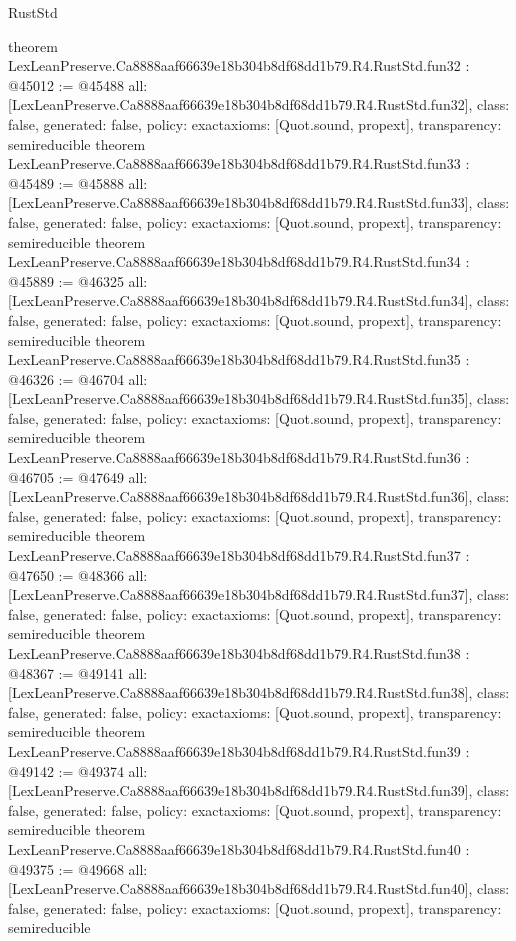 \begin{lexlean}{RustStd}
\begin{coremodule}
{}
theorem LexLeanPreserve.Ca8888aaf66639e18b304b8df68dd1b79.R4.RustStd.fun32 : @45012 := @45488 {
  all: [LexLeanPreserve.Ca8888aaf66639e18b304b8df68dd1b79.R4.RustStd.fun32],
  class: false,
  generated: false,
  policy: exact{axioms: [Quot.sound, propext]},
  transparency: semireducible
}
theorem LexLeanPreserve.Ca8888aaf66639e18b304b8df68dd1b79.R4.RustStd.fun33 : @45489 := @45888 {
  all: [LexLeanPreserve.Ca8888aaf66639e18b304b8df68dd1b79.R4.RustStd.fun33],
  class: false,
  generated: false,
  policy: exact{axioms: [Quot.sound, propext]},
  transparency: semireducible
}
theorem LexLeanPreserve.Ca8888aaf66639e18b304b8df68dd1b79.R4.RustStd.fun34 : @45889 := @46325 {
  all: [LexLeanPreserve.Ca8888aaf66639e18b304b8df68dd1b79.R4.RustStd.fun34],
  class: false,
  generated: false,
  policy: exact{axioms: [Quot.sound, propext]},
  transparency: semireducible
}
theorem LexLeanPreserve.Ca8888aaf66639e18b304b8df68dd1b79.R4.RustStd.fun35 : @46326 := @46704 {
  all: [LexLeanPreserve.Ca8888aaf66639e18b304b8df68dd1b79.R4.RustStd.fun35],
  class: false,
  generated: false,
  policy: exact{axioms: [Quot.sound, propext]},
  transparency: semireducible
}
theorem LexLeanPreserve.Ca8888aaf66639e18b304b8df68dd1b79.R4.RustStd.fun36 : @46705 := @47649 {
  all: [LexLeanPreserve.Ca8888aaf66639e18b304b8df68dd1b79.R4.RustStd.fun36],
  class: false,
  generated: false,
  policy: exact{axioms: [Quot.sound, propext]},
  transparency: semireducible
}
theorem LexLeanPreserve.Ca8888aaf66639e18b304b8df68dd1b79.R4.RustStd.fun37 : @47650 := @48366 {
  all: [LexLeanPreserve.Ca8888aaf66639e18b304b8df68dd1b79.R4.RustStd.fun37],
  class: false,
  generated: false,
  policy: exact{axioms: [Quot.sound, propext]},
  transparency: semireducible
}
theorem LexLeanPreserve.Ca8888aaf66639e18b304b8df68dd1b79.R4.RustStd.fun38 : @48367 := @49141 {
  all: [LexLeanPreserve.Ca8888aaf66639e18b304b8df68dd1b79.R4.RustStd.fun38],
  class: false,
  generated: false,
  policy: exact{axioms: [Quot.sound, propext]},
  transparency: semireducible
}
theorem LexLeanPreserve.Ca8888aaf66639e18b304b8df68dd1b79.R4.RustStd.fun39 : @49142 := @49374 {
  all: [LexLeanPreserve.Ca8888aaf66639e18b304b8df68dd1b79.R4.RustStd.fun39],
  class: false,
  generated: false,
  policy: exact{axioms: [Quot.sound, propext]},
  transparency: semireducible
}
theorem LexLeanPreserve.Ca8888aaf66639e18b304b8df68dd1b79.R4.RustStd.fun40 : @49375 := @49668 {
  all: [LexLeanPreserve.Ca8888aaf66639e18b304b8df68dd1b79.R4.RustStd.fun40],
  class: false,
  generated: false,
  policy: exact{axioms: [Quot.sound, propext]},
  transparency: semireducible
}
\end{coremodule}
\end{lexlean}
